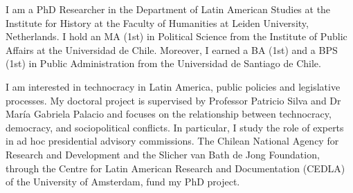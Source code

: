 




\par{I am a PhD Researcher in the Department of Latin American Studies at the Institute for History at the Faculty of Humanities at Leiden University, Netherlands. I hold an MA (1st) in Political Science from the Institute of Public Affairs at the Universidad de Chile. Moreover, I earned a BA (1st) and a BPS (1st) in Public Administration from the Universidad de Santiago de Chile.

I am interested in technocracy in Latin America, public policies and legislative processes. My doctoral project is supervised by Professor Patricio Silva and Dr María Gabriela Palacio and focuses on the relationship between technocracy, democracy, and sociopolitical conflicts. In particular, I study the role of experts in ad hoc presidential advisory commissions. The Chilean National Agency for Research and Development and the Slicher van Bath de Jong Foundation, through the Centre for Latin American Research and Documentation (CEDLA) of the University of Amsterdam, fund my PhD project.}\\